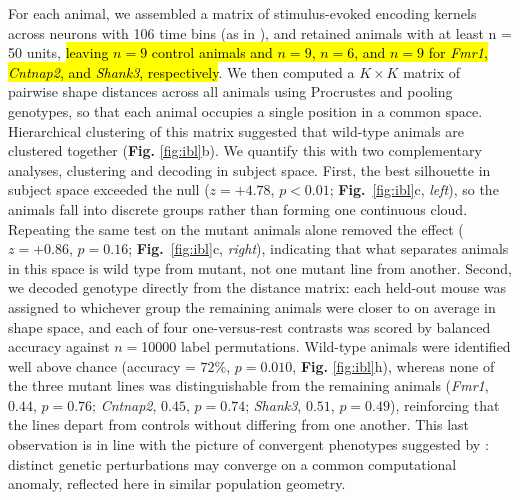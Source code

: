 For each animal, we assembled a matrix of stimulus-evoked encoding kernels across neurons with 106 time bins (as in \cite{noel2025}), and retained animals with at least n = 50 units, \hl{leaving $n=9$ control animals and $n=9$, $n=6$, and $n=9$ for \textit{Fmr1}, \textit{Cntnap2}, and \textit{Shank3}, respectively}. We then computed a $K \times K$ matrix of pairwise shape distances across all animals using Procrustes and pooling genotypes, so that each animal occupies a single position in a common space. Hierarchical clustering of this matrix suggested that wild-type animals are clustered together (\textbf{Fig.} \ref{fig:ibl}b). We quantify this with two complementary analyses, clustering and decoding in subject space. First, the best silhouette in subject space exceeded the null ($z = +4.78$, $p < 0.01$; \textbf{Fig.}~\ref{fig:ibl}c, \textit{left}), so the animals fall into discrete groups rather than forming one continuous cloud. Repeating the same test on the mutant animals alone removed the effect ($z = +0.86$, $p = 0.16$; \textbf{Fig.}~\ref{fig:ibl}c, \textit{right}), indicating that what separates animals in this space is wild type from mutant, not one mutant line from another. Second, we decoded genotype directly from the distance matrix: each held-out mouse was assigned to whichever group the remaining animals were closer to on average in shape space, and each of four one-versus-rest contrasts was scored by balanced accuracy against $n=$10000 label permutations. Wild-type animals were identified well above chance (accuracy =  $72\%$, $p = 0.010$, \textbf{Fig.} \ref{fig:ibl}h), whereas none of the three mutant lines was distinguishable from the remaining animals (\textit{Fmr1}, $0.44$, $p = 0.76$; \textit{Cntnap2}, $0.45$, $p = 0.74$; \textit{Shank3}, $0.51$, $p = 0.49$), reinforcing that the lines depart from controls without differing from one another. This last observation is in line with the picture of convergent phenotypes suggested by \cite{noel2025}: distinct genetic perturbations may converge on a common computational anomaly, reflected here in similar population geometry.


